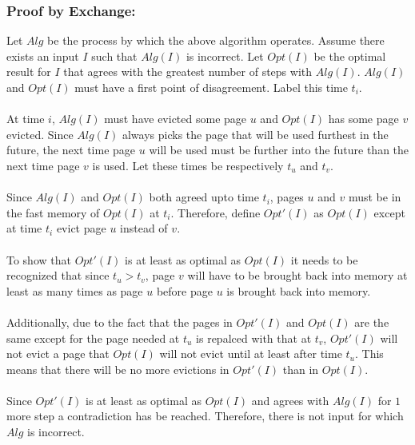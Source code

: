 \documentclass[12pt]{article}
\begin{document}
\subsubsection*{Proof by Exchange:}
Let $Alg$ be the process by which the above algorithm operates.
Assume there exists an input $I$ such that $Alg(I)$ is 
incorrect.  Let $Opt(I)$ be the optimal result for $I$
that agrees with the greatest number of steps with $Alg(I)$.
$Alg(I)$ and $Opt(I)$ must have a first point of disagreement.
Label this time $t_i$.\\\\
At time $i$, $Alg(I)$ must have evicted some page $u$ and 
$Opt(I)$ has some page $v$ evicted.  Since $Alg(I)$ always
picks the page that will be used furthest in the future,
the next time page $u$ will be used must be further into
the future than the next time page $v$ is used.  Let these
times be respectively $t_u$ and $t_v$.\\\\
Since $Alg(I)$ and $Opt(I)$ both agreed upto time $t_i$,
pages $u$ and $v$ must be in the fast memory of $Opt(I)$
at $t_i$.  Therefore, define $Opt'(I)$ as $Opt(I)$ except
at time $t_i$ evict page $u$ instead of $v$.\\\\
To show that $Opt'(I)$ is at least as optimal as $Opt(I)$     
it needs to be recognized that since $t_u > t_v$, page $v$
will have to be brought back into memory at least as many
times as page $u$ before
page $u$ is brought back into memory.\\\\
Additionally, due to the fact that the pages in $Opt'(I)$
and $Opt(I)$ are the same except for the page needed at
$t_u$ is repalced with that at $t_v$, $Opt'(I)$ will not
evict a page that $Opt(I)$ will not evict until at least
after time $t_u$.  This means that there will be no
more evictions in $Opt'(I)$ than in $Opt(I)$.\\\\   
Since $Opt'(I)$ is at least as optimal as $Opt(I)$ and 
agrees with $Alg(I)$ for $1$ more step a contradiction has
be reached.  Therefore, there is not input for which $Alg$
is incorrect.   
\end{document}
